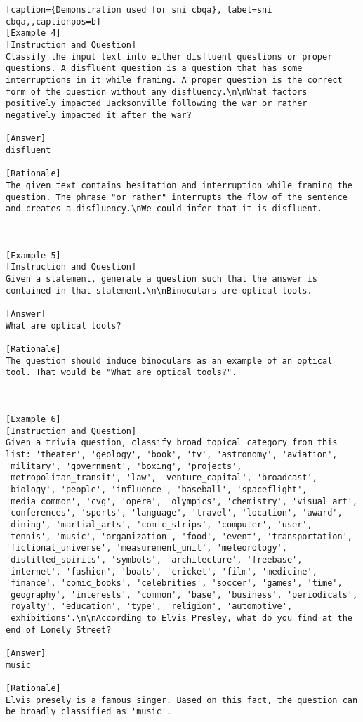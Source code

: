 \begin{lstlisting}[caption={Demonstration used for sni cbqa}, label=sni cbqa,,captionpos=b]
[Example 4]
[Instruction and Question]
Classify the input text into either disfluent questions or proper questions. A disfluent question is a question that has some interruptions in it while framing. A proper question is the correct form of the question without any disfluency.\n\nWhat factors positively impacted Jacksonville following the war or rather negatively impacted it after the war?

[Answer]
disfluent

[Rationale]
The given text contains hesitation and interruption while framing the question. The phrase "or rather" interrupts the flow of the sentence and creates a disfluency.\nWe could infer that it is disfluent.



[Example 5]
[Instruction and Question]
Given a statement, generate a question such that the answer is contained in that statement.\n\nBinoculars are optical tools.

[Answer]
What are optical tools?

[Rationale]
The question should induce binoculars as an example of an optical tool. That would be "What are optical tools?".



[Example 6]
[Instruction and Question]
Given a trivia question, classify broad topical category from this list: 'theater', 'geology', 'book', 'tv', 'astronomy', 'aviation', 'military', 'government', 'boxing', 'projects', 'metropolitan_transit', 'law', 'venture_capital', 'broadcast', 'biology', 'people', 'influence', 'baseball', 'spaceflight', 'media_common', 'cvg', 'opera', 'olympics', 'chemistry', 'visual_art', 'conferences', 'sports', 'language', 'travel', 'location', 'award', 'dining', 'martial_arts', 'comic_strips', 'computer', 'user', 'tennis', 'music', 'organization', 'food', 'event', 'transportation', 'fictional_universe', 'measurement_unit', 'meteorology', 'distilled_spirits', 'symbols', 'architecture', 'freebase', 'internet', 'fashion', 'boats', 'cricket', 'film', 'medicine', 'finance', 'comic_books', 'celebrities', 'soccer', 'games', 'time', 'geography', 'interests', 'common', 'base', 'business', 'periodicals', 'royalty', 'education', 'type', 'religion', 'automotive', 'exhibitions'.\n\nAccording to Elvis Presley, what do you find at the end of Lonely Street?

[Answer]
music

[Rationale]
Elvis presely is a famous singer. Based on this fact, the question can be broadly classified as 'music'.




\end{lstlisting}
